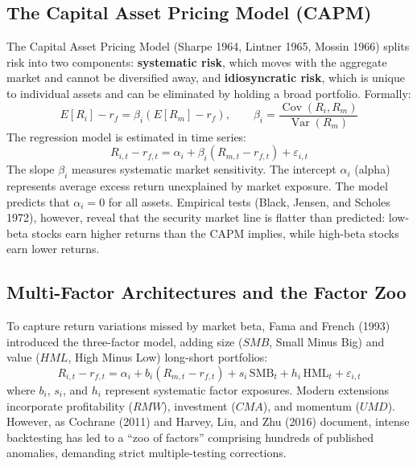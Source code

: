 \subsection{The Capital Asset Pricing Model (CAPM)}
\label{sec:03-capm}
The Capital Asset Pricing Model (Sharpe 1964, Lintner 1965, Mossin 1966) splits risk into two components: \textbf{systematic risk}, which moves with the aggregate market and cannot be diversified away, and \textbf{idiosyncratic risk}, which is unique to individual assets and can be eliminated by holding a broad portfolio. Formally:
\begin{equation}
  E[R_i] - r_f = \beta_i \left(E[R_m] - r_f\right), \qquad \beta_i = \frac{\operatorname{Cov}(R_i, R_m)}{\operatorname{Var}(R_m)}
  \label{eq:03-capm}
\end{equation}
The regression model is estimated in time series:
\begin{equation}
  R_{i,t} - r_{f,t} = \alpha_i + \beta_i (R_{m,t} - r_{f,t}) + \varepsilon_{i,t}
  \label{eq:03-capm-ts}
\end{equation}
The slope $\beta_i$ measures systematic market sensitivity. The intercept $\alpha_i$ (alpha) represents average excess return unexplained by market exposure. The model predicts that $\alpha_i = 0$ for all assets. Empirical tests (Black, Jensen, and Scholes 1972), however, reveal that the security market line is flatter than predicted: low-beta stocks earn higher returns than the CAPM implies, while high-beta stocks earn lower returns.

\subsection{Multi-Factor Architectures and the Factor Zoo}
\label{sec:03-factors}
To capture return variations missed by market beta, Fama and French (1993) introduced the three-factor model, adding size ($SMB$, Small Minus Big) and value ($HML$, High Minus Low) long-short portfolios:
\begin{equation}
  R_{i,t} - r_{f,t} = \alpha_i + b_i (R_{m,t} - r_{f,t}) + s_i \,\mathrm{SMB}_t + h_i \,\mathrm{HML}_t + \varepsilon_{i,t}
  \label{eq:03-ff3}
\end{equation}
where $b_i$, $s_i$, and $h_i$ represent systematic factor exposures. Modern extensions incorporate profitability ($RMW$), investment ($CMA$), and momentum ($UMD$). However, as Cochrane (2011) and Harvey, Liu, and Zhu (2016) document, intense backtesting has led to a ``zoo of factors'' comprising hundreds of published anomalies, demanding strict multiple-testing corrections.

